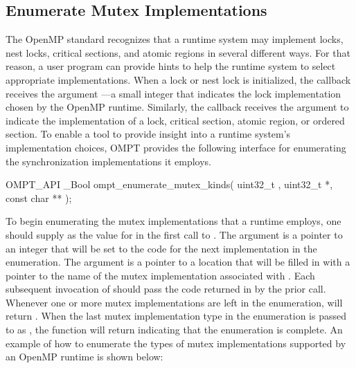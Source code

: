 \documentclass{article}
\begin{document}
 \subsection{Enumerate Mutex Implementations}
 \label{ompt_enumerate_mutex_kinds}
 
The OpenMP standard recognizes that a runtime system may implement locks, nest locks, critical sections, and atomic regions in several different ways. For that reason, a user program can provide hints to help the runtime system to select appropriate implementations.
When a lock or nest lock is initialized, the  callback receives the argument ---a small integer that indicates the lock implementation chosen by the OpenMP runtime. Similarly,  the  callback receives the argument  to indicate 
the implementation of a lock, critical section, atomic region, or ordered section. To enable a tool to provide insight into a runtime system's implementation choices, OMPT provides
the following interface for enumerating the synchronization implementations it employs.

\begin{boxedcode}
OMPT\_API \_Bool ompt\_enumerate\_mutex\_kinds(
  uint32\_t , 
  uint32\_t *, 
  const char **
);
\end{boxedcode}

\noindent
\sloppy
To begin enumerating the mutex implementations that a runtime  employs, one should supply 
  as the value for  in the first call to .
The argument  is a pointer to an integer that will be set to the code for the next implementation in the enumeration.
The argument  is a pointer to a location that will be filled in with a pointer to the name of the mutex implementation associated with . 
Each subsequent invocation of  should pass the code returned in  by the prior call.
Whenever one or more mutex implementations are left in the enumeration,  will return .
When the last mutex implementation type in the enumeration is passed to  as , 
the function will return  indicating that the enumeration is complete.
An example of how to enumerate the types of mutex implementations supported by an OpenMP runtime is shown below:
\end{document}

